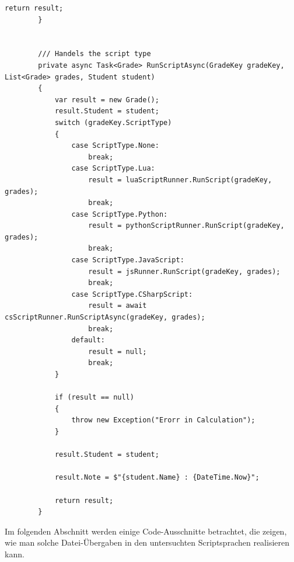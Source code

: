 \begin{lstlisting}[language={[Sharp]C}, caption=Code for loading data for Calculation, label=lst:imp:calc]
            return result;
        }

        
        /// Handels the script type
        private async Task<Grade> RunScriptAsync(GradeKey gradeKey, List<Grade> grades, Student student)
        {
            var result = new Grade();
            result.Student = student;
            switch (gradeKey.ScriptType)
            {
                case ScriptType.None:
                    break;
                case ScriptType.Lua:
                    result = luaScriptRunner.RunScript(gradeKey, grades);
                    break;
                case ScriptType.Python:
                    result = pythonScriptRunner.RunScript(gradeKey, grades);
                    break;
                case ScriptType.JavaScript:
                    result = jsRunner.RunScript(gradeKey, grades);
                    break;
                case ScriptType.CSharpScript:
                    result = await csScriptRunner.RunScriptAsync(gradeKey, grades);
                    break;
                default:
                    result = null;
                    break;
            }

            if (result == null)
            {
                throw new Exception("Erorr in Calculation");
            }

            result.Student = student;

            result.Note = $"{student.Name} : {DateTime.Now}";

            return result;
        }
\end{lstlisting}

\newpage
Im folgenden Abschnitt  werden einige Code-Ausschnitte betrachtet, die zeigen, wie man solche Datei-Übergaben in den untersuchten Scriptsprachen realisieren kann. 

